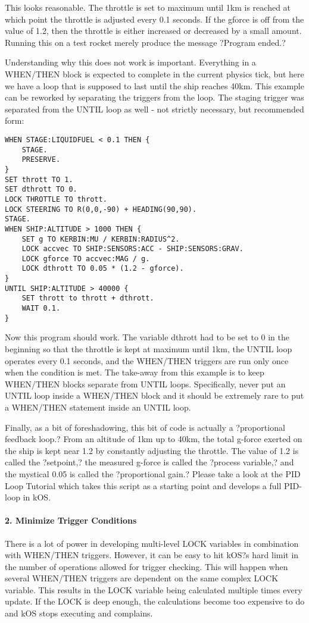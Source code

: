 This looks reasonable. The throttle is set to maximum until 1km is reached at which point the throttle is adjusted every 0.1 seconds. If the gforce is off from the value of 1.2, then the throttle is either increased or decreased by a small amount. Running this on a test rocket merely produce the message ?Program ended.?

Understanding why this does not work is important. Everything in a WHEN/THEN block is expected to complete in the current physics tick, but here we have a loop that is supposed to last until the ship reaches 40km. This example can be reworked by separating the triggers from the loop. The staging trigger was separated from the UNTIL loop as well - not strictly necessary, but recommended form:

\begin{Verbatim}[frame=single]
WHEN STAGE:LIQUIDFUEL < 0.1 THEN {
    STAGE.
    PRESERVE.
}
SET thrott TO 1.
SET dthrott TO 0.
LOCK THROTTLE TO thrott.
LOCK STEERING TO R(0,0,-90) + HEADING(90,90).
STAGE.
WHEN SHIP:ALTITUDE > 1000 THEN {
    SET g TO KERBIN:MU / KERBIN:RADIUS^2.
    LOCK accvec TO SHIP:SENSORS:ACC - SHIP:SENSORS:GRAV.
    LOCK gforce TO accvec:MAG / g.
    LOCK dthrott TO 0.05 * (1.2 - gforce).
}
UNTIL SHIP:ALTITUDE > 40000 {
    SET thrott to thrott + dthrott.
    WAIT 0.1.
}
\end{Verbatim} 

Now this program should work. The variable dthrott had to be set to 0 in the beginning so that the throttle is kept at maximum until 1km, the UNTIL loop operates every 0.1 seconds, and the WHEN/THEN triggers are run only once when the condition is met. The take-away from this example is to keep WHEN/THEN blocks separate from UNTIL loops. Specifically, never put an UNTIL loop inside a WHEN/THEN block and it should be extremely rare to put a WHEN/THEN statement inside an UNTIL loop.

Finally, as a bit of foreshadowing, this bit of code is actually a ?proportional feedback loop.? From an altitude of 1km up to 40km, the total g-force exerted on the ship is kept near 1.2 by constantly adjusting the throttle. The value of 1.2 is called the ?setpoint,? the measured g-force is called the ?process variable,? and the mystical 0.05 is called the ?proportional gain.? Please take a look at the PID Loop Tutorial which takes this script as a starting point and develops a full PID-loop in kOS.

\paragraph{2. Minimize Trigger Conditions}
There is a lot of power in developing multi-level LOCK variables in combination with WHEN/THEN triggers. However, it can be easy to hit kOS?s hard limit in the number of operations allowed for trigger checking. This will happen when several WHEN/THEN triggers are dependent on the same complex LOCK variable. This results in the LOCK variable being calculated multiple times every update. If the LOCK is deep enough, the calculations become too expensive to do and kOS stops executing and complains.

